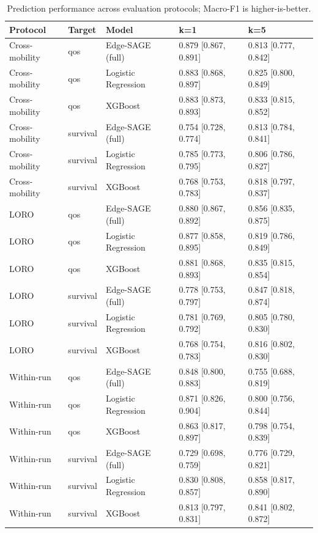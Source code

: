 \begin{table}[tb]
\caption{Prediction performance across evaluation protocols; Macro-F1 is higher-is-better.}
\label{tab:stage7-protocols}
\begin{tabular}{lllll}
\toprule
Protocol & Target & Model & k=1 & k=5 \\
\midrule
Cross-mobility & qos & Edge-SAGE (full) & 0.879 [0.867, 0.891] & 0.813 [0.777, 0.842] \\
Cross-mobility & qos & Logistic Regression & 0.883 [0.868, 0.897] & 0.825 [0.800, 0.849] \\
Cross-mobility & qos & XGBoost & 0.883 [0.873, 0.893] & 0.833 [0.815, 0.852] \\
Cross-mobility & survival & Edge-SAGE (full) & 0.754 [0.728, 0.774] & 0.813 [0.784, 0.841] \\
Cross-mobility & survival & Logistic Regression & 0.785 [0.773, 0.795] & 0.806 [0.786, 0.827] \\
Cross-mobility & survival & XGBoost & 0.768 [0.753, 0.783] & 0.818 [0.797, 0.837] \\
LORO & qos & Edge-SAGE (full) & 0.880 [0.867, 0.892] & 0.856 [0.835, 0.875] \\
LORO & qos & Logistic Regression & 0.877 [0.858, 0.895] & 0.819 [0.786, 0.849] \\
LORO & qos & XGBoost & 0.881 [0.868, 0.893] & 0.835 [0.815, 0.854] \\
LORO & survival & Edge-SAGE (full) & 0.778 [0.753, 0.797] & 0.847 [0.818, 0.874] \\
LORO & survival & Logistic Regression & 0.781 [0.769, 0.792] & 0.805 [0.780, 0.830] \\
LORO & survival & XGBoost & 0.768 [0.754, 0.783] & 0.816 [0.802, 0.830] \\
Within-run & qos & Edge-SAGE (full) & 0.848 [0.800, 0.883] & 0.755 [0.688, 0.819] \\
Within-run & qos & Logistic Regression & 0.871 [0.826, 0.904] & 0.800 [0.756, 0.844] \\
Within-run & qos & XGBoost & 0.863 [0.817, 0.897] & 0.798 [0.754, 0.839] \\
Within-run & survival & Edge-SAGE (full) & 0.729 [0.698, 0.759] & 0.776 [0.729, 0.821] \\
Within-run & survival & Logistic Regression & 0.830 [0.808, 0.857] & 0.858 [0.817, 0.890] \\
Within-run & survival & XGBoost & 0.813 [0.797, 0.831] & 0.841 [0.802, 0.872] \\
\bottomrule
\end{tabular}
\end{table}
